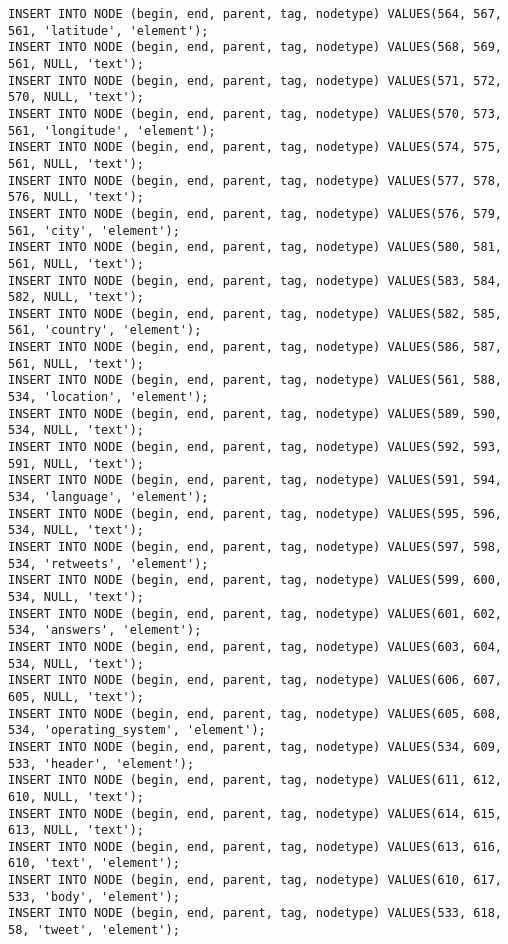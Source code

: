 \begin{verbatim}
INSERT INTO NODE (begin, end, parent, tag, nodetype) VALUES(564, 567, 561, 'latitude', 'element');
INSERT INTO NODE (begin, end, parent, tag, nodetype) VALUES(568, 569, 561, NULL, 'text');
INSERT INTO NODE (begin, end, parent, tag, nodetype) VALUES(571, 572, 570, NULL, 'text');
INSERT INTO NODE (begin, end, parent, tag, nodetype) VALUES(570, 573, 561, 'longitude', 'element');
INSERT INTO NODE (begin, end, parent, tag, nodetype) VALUES(574, 575, 561, NULL, 'text');
INSERT INTO NODE (begin, end, parent, tag, nodetype) VALUES(577, 578, 576, NULL, 'text');
INSERT INTO NODE (begin, end, parent, tag, nodetype) VALUES(576, 579, 561, 'city', 'element');
INSERT INTO NODE (begin, end, parent, tag, nodetype) VALUES(580, 581, 561, NULL, 'text');
INSERT INTO NODE (begin, end, parent, tag, nodetype) VALUES(583, 584, 582, NULL, 'text');
INSERT INTO NODE (begin, end, parent, tag, nodetype) VALUES(582, 585, 561, 'country', 'element');
INSERT INTO NODE (begin, end, parent, tag, nodetype) VALUES(586, 587, 561, NULL, 'text');
INSERT INTO NODE (begin, end, parent, tag, nodetype) VALUES(561, 588, 534, 'location', 'element');
INSERT INTO NODE (begin, end, parent, tag, nodetype) VALUES(589, 590, 534, NULL, 'text');
INSERT INTO NODE (begin, end, parent, tag, nodetype) VALUES(592, 593, 591, NULL, 'text');
INSERT INTO NODE (begin, end, parent, tag, nodetype) VALUES(591, 594, 534, 'language', 'element');
INSERT INTO NODE (begin, end, parent, tag, nodetype) VALUES(595, 596, 534, NULL, 'text');
INSERT INTO NODE (begin, end, parent, tag, nodetype) VALUES(597, 598, 534, 'retweets', 'element');
INSERT INTO NODE (begin, end, parent, tag, nodetype) VALUES(599, 600, 534, NULL, 'text');
INSERT INTO NODE (begin, end, parent, tag, nodetype) VALUES(601, 602, 534, 'answers', 'element');
INSERT INTO NODE (begin, end, parent, tag, nodetype) VALUES(603, 604, 534, NULL, 'text');
INSERT INTO NODE (begin, end, parent, tag, nodetype) VALUES(606, 607, 605, NULL, 'text');
INSERT INTO NODE (begin, end, parent, tag, nodetype) VALUES(605, 608, 534, 'operating_system', 'element');
INSERT INTO NODE (begin, end, parent, tag, nodetype) VALUES(534, 609, 533, 'header', 'element');
INSERT INTO NODE (begin, end, parent, tag, nodetype) VALUES(611, 612, 610, NULL, 'text');
INSERT INTO NODE (begin, end, parent, tag, nodetype) VALUES(614, 615, 613, NULL, 'text');
INSERT INTO NODE (begin, end, parent, tag, nodetype) VALUES(613, 616, 610, 'text', 'element');
INSERT INTO NODE (begin, end, parent, tag, nodetype) VALUES(610, 617, 533, 'body', 'element');
INSERT INTO NODE (begin, end, parent, tag, nodetype) VALUES(533, 618, 58, 'tweet', 'element');

\end{verbatim}
